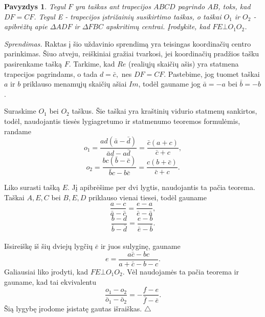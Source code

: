 \documentclass[11pt,a4paper,twoside]{book}
\newenvironment{sprendimas}{\noindent \textit{Sprendimas.}}{\hfill $\triangle$}
\newcounter{foo}[subsection]
\newtheorem{pavnr}[foo]{Pavyzdys}
\theoremstyle{definition} \newtheorem*{api}{Apibrėžimas}
\theoremstyle{remark} \newtheorem*{pastaba}{Pastaba}
\begin{document}
\begin{pavnr}
Tegul $F$ yra taškas ant trapecijos $ABCD$ pagrindo $AB$, toks, kad $DF=CF$. Tegul E - trapecijos įstrižainių susikirtimo taškas, o taškai $O_1$ ir $O_2$ - apibrėžtų apie $ \Delta ADF$ ir $\Delta FBC$ apskritimų centrai. Įrodykite, kad $ FE \bot O_1 O_2 $.
\end{pavnr}
\begin{sprendimas}
Raktas į šio uždavinio sprendimą yra teisingas koordinačių centro parinkimas. 
Šiuo atveju, reiškiniai gražiai tvarkosi, jei koordinačių pradžios tašku pasirenkame tašką $F$. Tarkime, kad $Re$ (realiųjų skaičių ašis) yra statmena trapecijos pagrindams, o tada $d = \bar c ,$ nes $DF=CF$. Pastebime, jog tuomet taškai $a$ ir $b$ priklauso menamųjų skaičių ašiai $Im$, todėl gauname jog $ \bar a = - a $ bei $ \bar b = - b$.

Suraskime $O_1$ bei $O_2$ taškus. Šie taškai yra kraštinių vidurio statmenų sankirtos, todėl, naudojantis tiesės lygiagretumo ir statmenumo teoremos formulėmis, randame
$$ o_1 = \frac { ad( \bar a - \bar d) } { \bar a d - a \bar d } = \frac {\bar c ( a + c) } { \bar c + c },$$  
$$  o_2 = \frac { bc( \bar b - \bar c) } { \bar b c - b \bar c } = \frac { c( b + \bar c) } { \bar c + c }.$$

Liko surasti tašką $E$. Jį apibrėšime per dvi lygtis, naudojantis ta pačia teorema. Taškai $A, E, C$ bei $B, E, D$ priklauso vienai tiesei, todėl gauname
$$ \frac { a- c} {\bar a-\bar c} = \frac {e-a}{ \bar e - \bar a},$$
$$ \frac { b-d} {\bar b-\bar d} = \frac {e-b}{ \bar e - \bar b}.$$
\\ Išsireiškę iš šių dviejų lygčių  $ \bar e$ ir juos sulyginę, gauname
\\ $$ e = \frac { a \bar c - bc}{ a+ \bar c -b-c}.$$
Galiausiai liko įrodyti, kad $FE \bot O_1 O_2 $. Vėl naudojamės ta pačia teorema ir gauname, kad tai ekvivalentu
 $$  \frac {o_1 - o_2} { \bar o_1 - \bar o_2}= - \frac { f-e}{\bar f - \bar e}.$$
Šią lygybę įrodome įsistatę gautas išraiškas.
\end{sprendimas}
\end{document}
